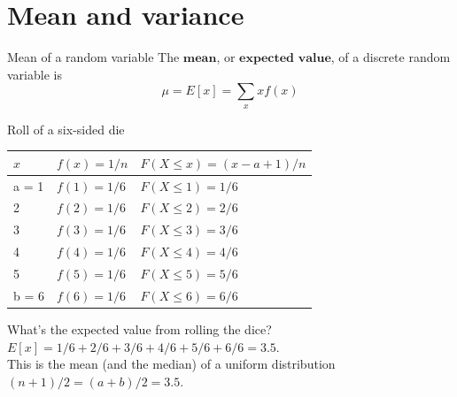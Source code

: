 \documentclass[11pt,table]{beamer}
\begin{document}
\section{Mean and variance}

\begin{frame}{Mean of a random variable}
The $\textbf{mean}$, or $\textbf{expected value}$, of a discrete random variable is
\begin{equation} \mu=E[x]=
\sum_{x}xf(x)
\end{equation}
\small
\begin{example} 
\scriptsize
\renewcommand{\baselinestretch}{1}
Roll of a six-sided die
\vspace{-5mm}
\renewcommand{\baselinestretch}{1}
	\begin{center}
		\begin{threeparttable}[htbp]
\label{tab:timeline}
\scriptsize
		\begin{tabular}{lll}
\toprule
$x$ & $f(x)=1/n$ & $F(X\leq x)=(x-a+1)/n$\\
\midrule
a = 1 & $f(1)=1/6$ & $F(X\leq 1)=1/6$\\
2 & $f(2)=1/6$ & $F(X\leq 2)=2/6$\\
3 & $f(3)=1/6$ & $F(X\leq 3)=3/6$\\
4 & $f(4)=1/6$ & $F(X\leq 4)=4/6$\\
5 & $f(5)=1/6$ & $F(X\leq 5)=5/6$\\
b = 6 & $f(6)=1/6$ & $F(X\leq 6)=6/6$\\
\bottomrule
		\end{tabular}
	\end{threeparttable}
\end{center}
\renewcommand{\baselinestretch}{1.45}
What's the expected value from rolling the dice? $E[x]=1/6+2/6+3/6+4/6+5/6+6/6=3.5.$\\
This is the mean (and the median) of a uniform distribution $(n+1)/2=(a+b)/2=3.5$.\\
\end{example}
\end{frame}
\end{document}
